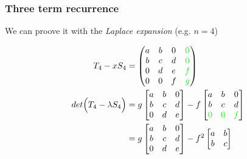 \documentclass{beamer}
\theoremstyle{definition} \newtheorem{de}{Def}
\theoremstyle{remark} \newtheorem{os}[de]{Oss}
\theoremstyle{plain} \newtheorem{te}[de]{Teo}
\theoremstyle{plain} \newtheorem{co}[de]{Cor}
\theoremstyle{plain} \newtheorem{pr}[de]{Prop}
\theoremstyle{plain} \newtheorem{lem}[de]{Lemm}
\theoremstyle{remark} \newtheorem{rem}[de]{Remark}
\begin{document}
\begin{frame}
  \frametitle{Three term recurrence}

  We can proove it with the \emph{Laplace expansion} (e.g. $n=4$)

  \begin{align*}
    T_4 - x S_4  &= \begin{pmatrix} 
      a & b & 0 & \textcolor{green}{0}\\
      b & c & d & \textcolor{green}{0}\\
      0 & d & e & \textcolor{green}{f}\\
      0 & 0 & f & \textcolor{green}{g}
    \end{pmatrix} \\
    det \Big( T_4 - \lambda S_4 \Big) &= g \begin{bmatrix}
      a & b & 0\\
      b & c & d\\
      0 & d & e
    \end{bmatrix} -f \begin{bmatrix}
      a & b & 0\\
      b & c & d\\
      \textcolor{green}{0} & \textcolor{green}{0} & \textcolor{green}{f}
    \end{bmatrix}\\
    &= g \begin{bmatrix} 
      a & b & 0\\
      b & c & d\\
      0 & d & e
    \end{bmatrix} - f^2 \begin{bmatrix} a & b \\ b & c \end{bmatrix}
  \end{align*}

\end{frame}
\end{document}
